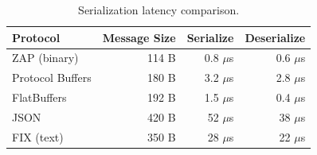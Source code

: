 \begin{table}[H]
\centering
\caption{Serialization latency comparison.}
\label{tab:latency}
\begin{tabular}{lrrr}
\toprule
\textbf{Protocol} & \textbf{Message Size} & \textbf{Serialize} & \textbf{Deserialize} \\
\midrule
ZAP (binary) & 114 B & 0.8 $\mu$s & 0.6 $\mu$s \\
Protocol Buffers & 180 B & 3.2 $\mu$s & 2.8 $\mu$s \\
FlatBuffers & 192 B & 1.5 $\mu$s & 0.4 $\mu$s \\
JSON & 420 B & 52 $\mu$s & 38 $\mu$s \\
FIX (text) & 350 B & 28 $\mu$s & 22 $\mu$s \\
\bottomrule
\end{tabular}
\end{table}


